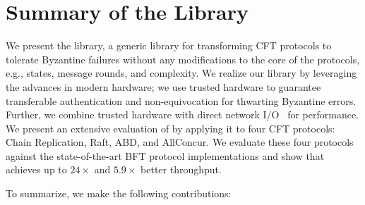 
\section{Summary of the \projecttitle{} Library}
We present the \projecttitle{} library, a generic library for transforming CFT protocols to tolerate Byzantine failures without any modifications to the core of the protocols, e.g., states, message rounds, and complexity. We realize our \projecttitle{} library by leveraging the advances in modern hardware; we use trusted hardware to guarantee transferable authentication and non-equivocation for thwarting Byzantine errors. Further, we combine trusted hardware with direct network I/O~\cite{rdma, dpdk} for performance. We present an extensive evaluation of \projecttitle{} by applying it to four CFT protocols: Chain Replication, Raft, ABD, and AllConcur. We evaluate these four protocols against the state-of-the-art BFT protocol implementations and show that \projecttitle{} achieves up to $24\times$ and $5.9\times$ better throughput.


 To summarize, we make the following contributions:



